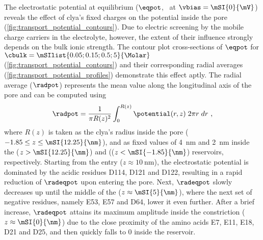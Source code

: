 The electrostatic potential at equilibrium ($\eqpot$, \ie~at $\vbias = \mSI{0}{\mV}$) reveals the effect of
\gls{clya}'s fixed charges on the potential inside the pore (\cref{fig:transport_potential_contours}). Due to
electric screening by the mobile charge carriers in the electrolyte, however, the extent of their influence
strongly depends on the bulk ionic strength. The contour plot cross-sections of $\eqpot$ for $\cbulk =
\mSIlist{0.05;0.15;0.5;5}{\Molar}$ (\cref{fig:transport_potential_contours}) and their corresponding radial
averages (\cref{fig:transport_potential_profiles}) demonstrate this effect aptly. The radial average
($\radpot$) represents the mean value along the longitudinal axis of the pore and can be computed using
%
\begin{align}\label{eq:epnp-ns_radpot}
  \radpot = \dfrac{1}{\pi R(z)^2}\int_{0}^{R(z)}\potential(r,z) \;2 \pi r \; dr
  \text{ ,}
\end{align}
%
where $R(z)$ is taken as the \gls{clya}'s radius inside the pore ($-1.85 \le z \le \mSI{12.25}{\nm}$), and as
fixed values of \SI{4}{\nm} and \SI{2}{\nm} inside the \cisi{} ($z > \mSI{12.25}{\nm}$) and \transi{} (($z <
\mSI{-1.85}{\nm}$) reservoirs, respectively. Starting from the \cisi{} entry ($z \approx \SI{10}{\nm}$), the
electrostatic potential is dominated by the acidic residues D114, D121 and D122, resulting in a rapid
reduction of $\radeqpot$ upon entering the pore. Next, $\radeqpot$ slowly decreases up until the middle of the
\lumen{} ($z \approx \mSI{5}{\nm}$), where the next set of negative residues, namely E53, E57 and D64, lower
it even further. After a brief increase, $\radeqpot$ attains its maximum amplitude inside the \transi{}
constriction ($z \approx \mSI{0}{\nm}$) due to the close proximity of the amino acids E7, E11, E18, D21 and
D25, and then quickly falls to \num{0} inside the \transi{} reservoir.

